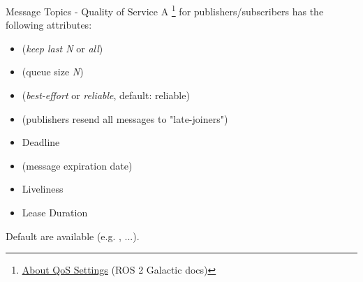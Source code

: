 \begin{frame}{Message Topics - Quality of Service}
A \footnote{\href{https://docs.ros.org/en/galactic/Concepts/About-Quality-of-Service-Settings.html}{\color{blue}\underline{About QoS Settings}} (ROS 2 Galactic docs)} for publishers/subscribers has the following attributes:
\begin{itemize}
  \item {} (\emph{keep last N} or \emph{all})
  \item {} (queue size \emph{N})
  \item {} (\emph{best-effort} or \emph{reliable}, default: reliable)
  \item {} (publishers resend all messages to "late-joiners")
  \item Deadline
  \item {} (message expiration date)
  \item Liveliness
  \item Lease Duration
\end{itemize}
Default  are available (e.g. , ...).
\end{frame}

